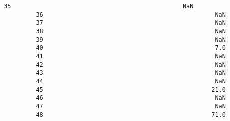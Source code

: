 \documentclass[11pt]{article}
\begin{document}
\begin{Verbatim}[commandchars=\\\{\}]
         35                                                NaN                                                                                      
         36                                                NaN                                                                                      
         37                                                NaN                                                                                      
         38                                                NaN                                                                                      
         39                                                NaN                                                                                      
         40                                                7.0                                                                                      
         41                                                NaN                                                                                      
         42                                                NaN                                                                                      
         43                                                NaN                                                                                      
         44                                                NaN                                                                                      
         45                                               21.0                                                                                      
         46                                                NaN                                                                                      
         47                                                NaN                                                                                      
         48                                               71.0                                                                                      
         

\end{Verbatim}
\end{document}
